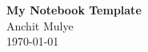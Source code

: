 \begin{titlepage}
    \thispagestyle{empty} %
    \centering
    \vfill                %
    \begin{center}
        {\Huge \textbf{My Notebook Template}}\\
        \vspace{1cm}
        {\Large Anchit Mulye}\\
        \vspace{0.5cm}
        {\Large \today}
    \end{center}
    \vfill                %
\end{titlepage}